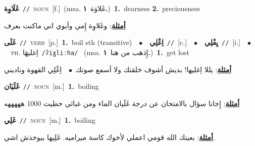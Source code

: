\documentclass[10pt,a4paper,twoside]{article} %
\begin{document}
\begin{multicols}{2}
{\setlength\topsep{0pt}\textbf{\foreignlanguage{arabic}{غَلَاوِة}}\ {\color{gray}\texttt{//}\color{black}}\ \textsc{noun}\ [f.]\ \color{gray}(msa. \foreignlanguage{arabic}{غَلاوَة}~\foreignlanguage{arabic}{\textbf{١.}})\color{black}\ \textbf{1.}~dearness  \textbf{2.}~preciousness\  \begin{flushright}\color{gray}\foreignlanguage{arabic}{\textbf{\underline{\foreignlanguage{arabic}{أمثلة}}}: وغَلاوِة إِمي وأبوي اني ماكنت بعرف}\end{flushright}\color{black}} \vspace{2mm}

{\setlength\topsep{0pt}\textbf{\foreignlanguage{arabic}{غَلَى}}\ {\color{gray}\texttt{//}\color{black}}\ \textsc{verb}\ [p.]\ \textbf{1.}~boil sth (transitive)\ \ $\bullet$\ \ \setlength\topsep{0pt}\textbf{\foreignlanguage{arabic}{اِغْلِي}}\ {\color{gray}\texttt{//}\color{black}}\ [c.]\ \ $\bullet$\ \ \setlength\topsep{0pt}\textbf{\foreignlanguage{arabic}{يِغْلِي}}\ {\color{gray}\texttt{//}\color{black}}\ [i.]\ \ $\bullet$\ \ \textsc{ph.} \color{gray} \foreignlanguage{arabic}{اِغليهَا}\color{black}\ {\color{gray}\texttt{/{\sffamily ʔiɣliːha}/}\color{black}}\ \color{gray} (msa. \foreignlanguage{arabic}{إِذهب من هنا}~\foreignlanguage{arabic}{\textbf{١.}})\color{black}\ \textbf{1.}~get lost\  \begin{flushright}\color{gray}\foreignlanguage{arabic}{\textbf{\underline{\foreignlanguage{arabic}{أمثلة}}}: يللا اِغليها! بديش أشوف خلقتك ولا أسمع صوتك\ $\bullet$\ \  اِغْلِي القهوة وناديني}\end{flushright}\color{black}} \vspace{2mm}

{\setlength\topsep{0pt}\textbf{\foreignlanguage{arabic}{غَلَيَان}}\ {\color{gray}\texttt{//}\color{black}}\ \textsc{noun}\ [m.]\ \textbf{1.}~boiling\  \begin{flushright}\color{gray}\foreignlanguage{arabic}{\textbf{\underline{\foreignlanguage{arabic}{أمثلة}}}: إِجانا سؤال بالامتحان عن درجة غَلَيان الماء ومن غبائي حطيت 1000 هههههه}\end{flushright}\color{black}} \vspace{2mm}

{\setlength\topsep{0pt}\textbf{\foreignlanguage{arabic}{غَلِي}}\ {\color{gray}\texttt{//}\color{black}}\ \textsc{noun}\ [m.]\ \textbf{1.}~boiling\  \begin{flushright}\color{gray}\foreignlanguage{arabic}{\textbf{\underline{\foreignlanguage{arabic}{أمثلة}}}: بعينك الله قومي اعملي لأخوك كاسة ميراميه. غَلِيها بيوخذش اشي.}\end{flushright}\color{black}} \vspace{2mm}


\end{multicols}
\end{document}
